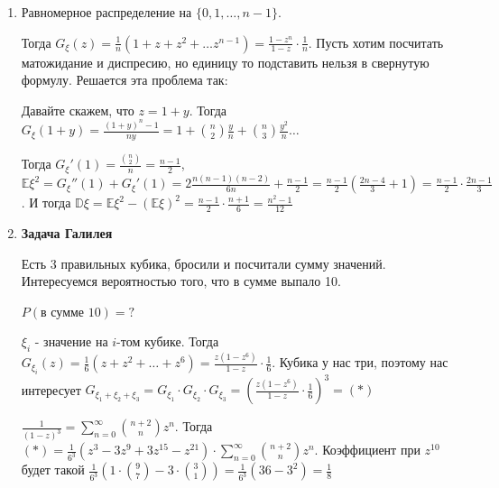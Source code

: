 \begin{example}
    \begin{enumerate}
        \item {
            Равномерное распределение на $\{ 0, 1, \ldots, n - 1 \}$.

            Тогда $G_{\xi}(z) = \frac{1}{n}(1 + z + z^2 + \ldots z^{n - 1}) = \frac{1 - z^n}{1 - z} \cdot \frac{1}{n}$. Пусть хотим
            посчитать матожидание и диспресию, но единицу то подставить нельзя в свернутую формулу. Решается эта проблема так:

            Давайте скажем, что $z = 1 + y$. Тогда $G_{\xi}(1 + y) = \frac{(1 + y)^n - 1}{ny} = 1 + \binom{n}{2} \frac{y}{n} + \binom{n}{3} \frac{y^2}{n} \ldots$

            Тогда $G_{\xi}'(1) = \frac{\binom{n}{2}}{n} = \frac{n - 1}{2}$, $\mathbb{E} \xi^2 = G_{\xi}''(1) + G_{\xi}'(1) = 2\frac{n(n-1)(n-2)}{6n} + \frac{n - 1}{2} =
            \frac{n - 1}{2}(\frac{2n - 4}{3} + 1) = \frac{n - 1}{2} \cdot \frac{2n - 1}{3}$. И тогда $\mathbb{D} \xi = \mathbb{E}\xi^2 - (\mathbb{E}\xi)^2 =
            \frac{n - 1}{2} \cdot \frac{n + 1}{6} = \frac{n^2 - 1}{12}$
        }
        \item {
            \textbf{Задача Галилея}

            Есть 3 правильных кубика, бросили и посчитали сумму значений. Интересуемся вероятностью того, что
            в сумме выпало 10.

            $P(\text{в сумме 10}) = ?$

            $\xi_i$ - значение на $i$-том кубике. Тогда $G_{\xi_i}(z) = \frac{1}{6}(z + z^2 + \ldots + z^6) = \frac{z(1 - z^6)}{1 - z} \cdot \frac{1}{6}$.
            Кубика у нас три, поэтому нас интересует $G_{\xi_1 + \xi_2 + \xi_3} = G_{\xi_1} \cdot G_{\xi_2} \cdot G_{\xi_3} = \left ( \frac{z(1 - z^6)}{1 - z} \cdot \frac{1}{6} \right )^3 = (*)$
            
            $\frac{1}{(1 - z)^3} = \sum_{n = 0}^{\infty} \binom{n+2}{n} z^n$. Тогда $(*) = \frac{1}{6^3} (z^3 - 3z^9 + 3z^15 - z^21) \cdot \sum_{n = 0}^{\infty} \binom{n+2}{n} z^n$. Коэффициент при $z^{10}$ будет такой
            $\frac{1}{6^3} (1 \cdot \binom{9}{7} - 3 \cdot \binom{3}{1}) = \frac{1}{6^3} (36 - 3^2) = \frac{1}{8}$
        }
    \end{enumerate}
\end{example}